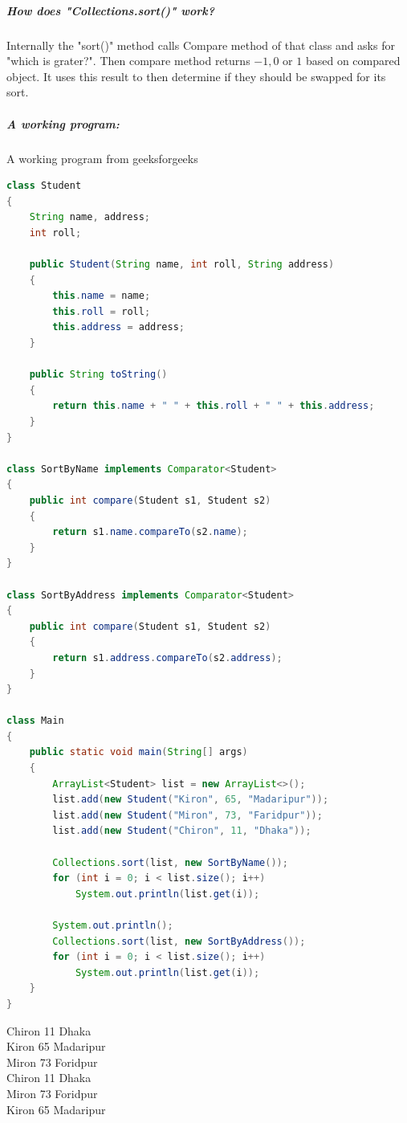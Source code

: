 \documentclass[10 pt]{book}
\begin{document}
\subparagraph{How does "Collections.sort()" work?}
Internally the "sort()" method calls Compare method of that class and asks for "which is grater?". Then compare method returns $-1, 0$ or $1$ based on compared object. It uses this result to then determine if they should be swapped for its sort.
\subparagraph{A working program:}
A working program from geeksforgeeks
\begin{lstlisting}[language = java, caption = Comparator for sorting Student class, backgroundcolor = \color{white}]
class Student
{
    String name, address;
    int roll;

    public Student(String name, int roll, String address)
    {
        this.name = name;
        this.roll = roll;
        this.address = address;
    }

    public String toString()
    {
        return this.name + " " + this.roll + " " + this.address;
    }
}

class SortByName implements Comparator<Student>
{
    public int compare(Student s1, Student s2)
    {
        return s1.name.compareTo(s2.name);
    }
}

class SortByAddress implements Comparator<Student>
{
    public int compare(Student s1, Student s2)
    {
        return s1.address.compareTo(s2.address);
    }
}

class Main
{
    public static void main(String[] args)
    {
        ArrayList<Student> list = new ArrayList<>();
        list.add(new Student("Kiron", 65, "Madaripur"));
        list.add(new Student("Miron", 73, "Faridpur"));
        list.add(new Student("Chiron", 11, "Dhaka"));

        Collections.sort(list, new SortByName());
        for (int i = 0; i < list.size(); i++)
            System.out.println(list.get(i));

        System.out.println();
        Collections.sort(list, new SortByAddress());
        for (int i = 0; i < list.size(); i++)
            System.out.println(list.get(i));
    }
}
\end{lstlisting}

\begin{tcolorbox}[enhanced, title = Output, attach boxed title to top left, width = 5 cm]
	Chiron 11 Dhaka\\
	Kiron 65 Madaripur\\
	Miron 73 Foridpur\\
\vspace{2.5 mm}
	Chiron 11 Dhaka\\
	Miron 73 Foridpur\\
	Kiron 65 Madaripur\\
\end{tcolorbox}
\end{document}
